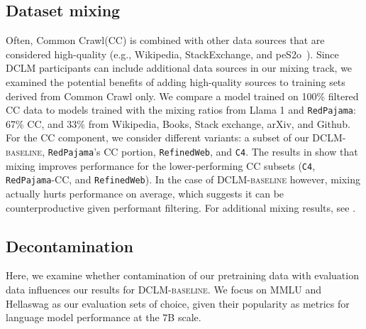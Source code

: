 \documentclass{article}
\newcommand{\hqpool}{\textsc{DCLM-baseline}\xspace}
\newcommand{\strack}{\texttt{1B-1x}\xspace}
\newcommand{\cfour}{\texttt{C4}\xspace}
\newcommand{\rpj}{\texttt{RedPajama}\xspace}
\newcommand{\rw}{\texttt{RefinedWeb}\xspace}
\newcommand{\llama}{Llama\xspace}
\newcommand{\commoncrawl}{Common Crawl\xspace}
\begin{document}
\subsection{Dataset mixing}
\label{sec:mixing}
Often, \commoncrawl (CC) is combined with other data sources that are considered high-quality \citep{rpj, pile, openwebtext, llama2} (e.g., Wikipedia, StackExchange, and peS2o~\citep{peS2o}).
Since DCLM participants can include additional data sources in our mixing track, we examined the potential benefits of adding high-quality sources to training sets derived from \commoncrawl only.
We compare a model trained on 100\% filtered CC data to models trained with the mixing ratios from \llama 1 and \rpj: 67\% CC, and 33\% from Wikipedia, Books, Stack exchange, arXiv, and Github.
For the CC component, we consider different variants: a subset of our \hqpool, \rpj's CC portion, \rw, and \cfour.
The results in  show that mixing improves performance for the lower-performing CC subsets (\cfour, \rpj-CC, and \rw).
In the case of \hqpool however, mixing actually hurts performance on average, which suggests it can be counterproductive given performant filtering.
For additional mixing results, see .

\begin{table}[ht]
\centering
\caption{\textbf{Mixing high-quality sources with subsets of CommonCrawl} (\strack{} scale). We evaluate the impact of mixing high-quality sources (`RPJ extras') with various datasets derived from CommonCrawl, using the mixing ratios from \llama/RPJ. Numbers in parentheses indicate the gain or loss in performance due to mixing compared to using only the base dataset.}
\label{tab:mixing_cc}

\end{table}
\subsection{Decontamination}
\label{sec:decontamination}
\vspace{-2mm}


Here, we examine whether contamination of our pretraining data with evaluation data influences our results for \hqpool.
We focus on MMLU and Hellaswag as our evaluation sets of choice, given their popularity as metrics for language model performance at the 7B scale.
\end{document}
